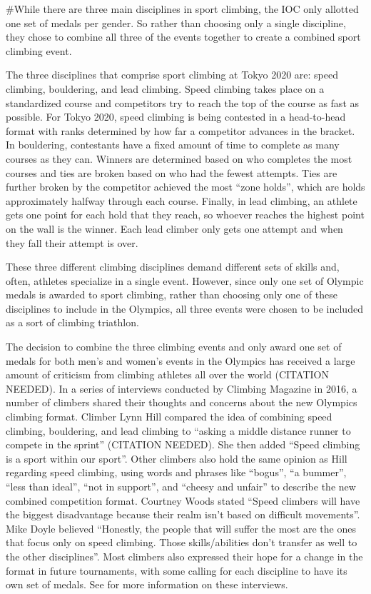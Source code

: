 \documentclass[12pt]{article}
\begin{document}
\#While there are three main disciplines in sport climbing, the IOC only
allotted one set of medals per gender. So rather than choosing only a
single discipline, they chose to combine all three of the events
together to create a combined sport climbing event.

The three disciplines that comprise sport climbing at Tokyo 2020 are:
speed climbing, bouldering, and lead climbing. Speed climbing takes
place on a standardized course and competitors try to reach the top of
the course as fast as possible. For Tokyo 2020, speed climbing is being
contested in a head-to-head format with ranks determined by how far a
competitor advances in the bracket. In bouldering, contestants have a
fixed amount of time to complete as many courses as they can. Winners
are determined based on who completes the most courses and ties are
broken based on who had the fewest attempts. Ties are further broken by
the competitor achieved the most ``zone holds'', which are holds
approximately halfway through each course. Finally, in lead climbing, an
athlete gets one point for each hold that they reach, so whoever reaches
the highest point on the wall is the winner. Each lead climber only gets
one attempt and when they fall their attempt is over.

These three different climbing disciplines demand different sets of
skills and, often, athletes specialize in a single event. However, since
only one set of Olympic medals is awarded to sport climbing, rather than
choosing only one of these disciplines to include in the Olympics, all
three events were chosen to be included as a sort of climbing triathlon.

The decision to combine the three climbing events and only award one set
of medals for both men's and women's events in the Olympics has received
a large amount of criticism from climbing athletes all over the world
(CITATION NEEDED). In a series of interviews conducted by Climbing
Magazine in 2016, a number of climbers shared their thoughts and
concerns about the new Olympics climbing format. Climber Lynn Hill
compared the idea of combining speed climbing, bouldering, and lead
climbing to ``asking a middle distance runner to compete in the sprint''
(CITATION NEEDED). She then added ``Speed climbing is a sport within our
sport''. Other climbers also hold the same opinion as Hill regarding
speed climbing, using words and phrases like ``bogus'', ``a bummer'',
``less than ideal'', ``not in support'', and ``cheesy and unfair'' to
describe the new combined competition format. Courtney Woods stated
``Speed climbers will have the biggest disadvantage because their realm
isn't based on difficult movements''. Mike Doyle believed ``Honestly,
the people that will suffer the most are the ones that focus only on
speed climbing. Those skills/abilities don't transfer as well to the
other disciplines''. Most climbers also expressed their hope for a
change in the format in future tournaments, with some calling for each
discipline to have its own set of medals. See \citet{blanchard2016} for
more information on these interviews.
\end{document}
